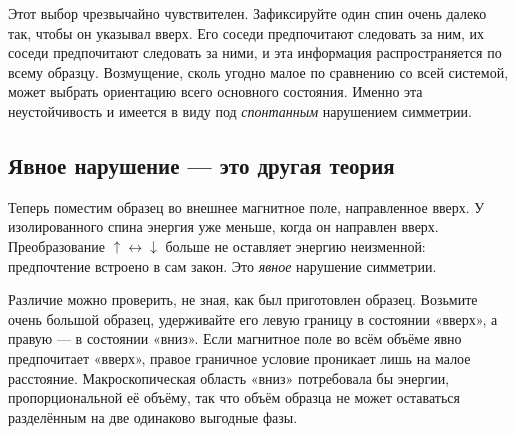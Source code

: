 Этот выбор чрезвычайно чувствителен. Зафиксируйте один спин очень далеко так, чтобы он указывал вверх. Его соседи предпочитают следовать за ним, их соседи предпочитают следовать за ними, и эта информация распространяется по всему образцу. Возмущение, сколь угодно малое по сравнению со всей системой, может выбрать ориентацию всего основного состояния. Именно эта неустойчивость и имеется в виду под \emph{спонтанным} нарушением симметрии.

\begin{classroomqa}
\end{classroomqa}

\begin{classroomqa}
\end{classroomqa}

\subsection{Явное нарушение — это другая теория}

Теперь поместим образец во внешнее магнитное поле, направленное вверх. У изолированного спина энергия уже меньше, когда он направлен вверх. Преобразование \(\uparrow\leftrightarrow\downarrow\) больше не оставляет энергию неизменной: предпочтение встроено в сам закон. Это \emph{явное} нарушение симметрии.

Различие можно проверить, не зная, как был приготовлен образец. Возьмите очень большой образец, удерживайте его левую границу в состоянии «вверх», а правую — в состоянии «вниз». Если магнитное поле во всём объёме явно предпочитает «вверх», правое граничное условие проникает лишь на малое расстояние. Макроскопическая область «вниз» потребовала бы энергии, пропорциональной её объёму, так что объём образца не может оставаться разделённым на две одинаково выгодные фазы.

